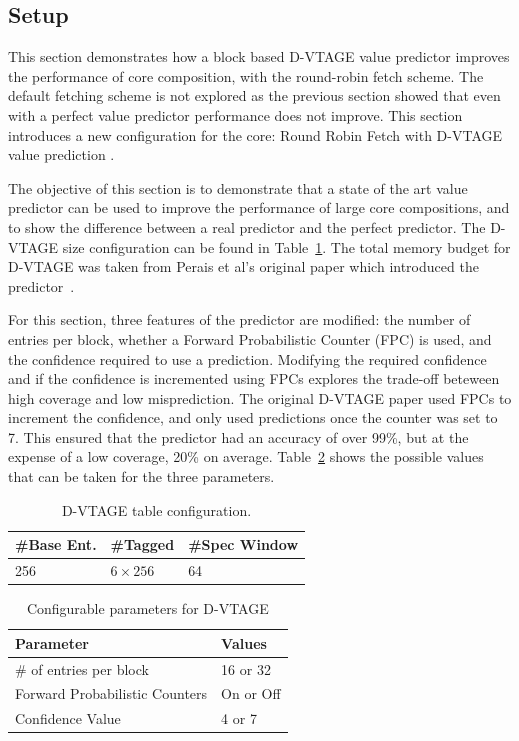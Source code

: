 \subsection{Setup}
This section demonstrates how a block based D-VTAGE value predictor improves the performance of core composition, with the round-robin fetch scheme.
The default fetching scheme is not explored as the previous section showed that even with a perfect value predictor performance does not improve.
This section introduces a new configuration for the core: Round Robin Fetch with D-VTAGE value prediction \nfvt{}.

The objective of this section is to demonstrate that a state of the art value predictor can be used to improve the performance of large core compositions, and to show the difference between a real predictor and the perfect predictor.
The D-VTAGE size configuration can be found in Table~\ref{tab:vtage-conf}.
The total memory budget for D-VTAGE was taken from Perais et al's original paper which introduced the predictor~\cite{}.

For this section, three features of the predictor are modified: the number of entries per block, whether a Forward Probabilistic Counter (FPC) is used, and the confidence required to use a prediction.
Modifying the required confidence and if the confidence is incremented using FPCs explores the trade-off beteween high coverage and low misprediction.
The original D-VTAGE paper used FPCs to increment the confidence, and only used predictions once the counter was set to 7.
This ensured that the predictor had an accuracy of over 99\%, but at the expense of a low coverage, 20\% on average.
Table~\ref{tab:vtage-params} shows the possible values that can be taken for the three parameters.



\begin{table}[t]
  \small
  \centering
 \begin{tabular} {| l | l | l |}
 \hline
	\#Base Ent. & \#Tagged & \#Spec Window\\ \hline
	256 & $6\times256$ & 64 \\ \hline
	\end{tabular}
  \caption{D-VTAGE table configuration.}\label{tab:vtage-conf}
  \vspace{1em}
\end{table}


\begin{table}[t]
\small
\centering
\begin{tabular}{p{5.2cm} p{1.8cm}}
\toprule
\textbf{Parameter} & \textbf{Values} \\ \midrule
\# of entries per block & 16 or 32\\
Forward Probabilistic Counters & On or Off \\
Confidence Value & 4 or 7 \\ \bottomrule
\end{tabular}
\caption{Configurable parameters for D-VTAGE}\label{tab:vtage-params}
\end{table}


